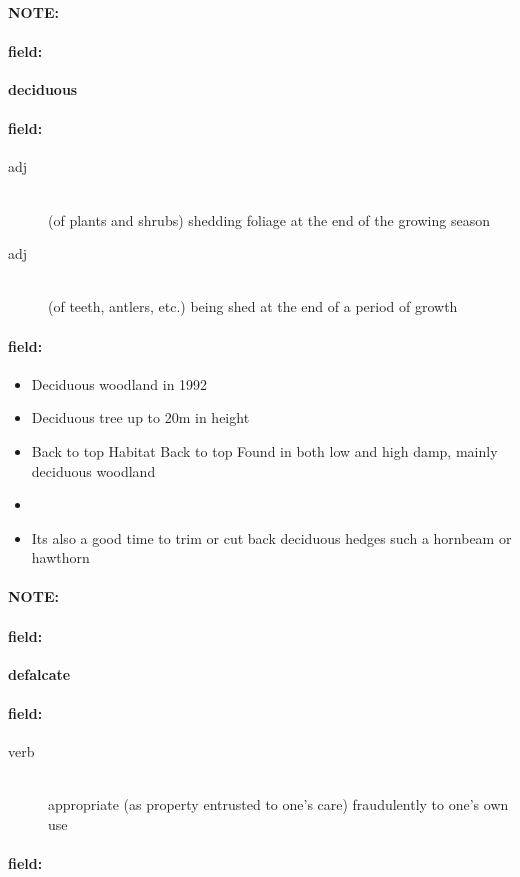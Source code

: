 \documentclass[12pt]{article}
\newenvironment{note}{\paragraph{NOTE:}}{}
\newenvironment{field}{\paragraph{field:}}{}
\begin{document}
\begin{note}
\begin{field}
\textbf{\large deciduous}
\end{field}


\begin{field}
\begin{description}
\item[adj] \hfill \\ 
(of plants and shrubs) shedding foliage at the end of the growing season

\item[adj] \hfill \\ 
(of teeth, antlers, etc.) being shed at the end of a period of growth

\end{description}
\end{field}

\begin{field}
\begin{itemize}
\item Deciduous woodland in 1992
\item Deciduous tree up to 20m in height
\item Back to top Habitat Back to top Found in both low and high damp, mainly deciduous woodland
\item 
\item Its also a good time to trim or cut back deciduous hedges such a hornbeam or hawthorn
\end{itemize}
\end{field}
\end{note}
\begin{note}
\begin{field}
\textbf{\large defalcate}
\end{field}


\begin{field}
\begin{description}
\item[verb] \hfill \\ 
appropriate (as property entrusted to one's care) fraudulently to one's own use

\end{description}
\end{field}

\begin{field}
\end{field}
\end{note}
\end{document}
